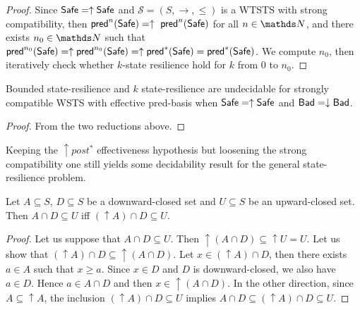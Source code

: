 \begin{proof}
Since $\textsf{Safe}=\uparrow \textsf{Safe}$ and
$\mathscr{S}=(S,\rightarrow,\leq)$ is a WTSTS with strong %
compatibility, then $\textsf{pred}^n(\textsf{Safe})= \uparrow~\textsf{pred}^n(\textsf{Safe})$ for all $n \in \N$,
and there exists $n_0 \in \N$ such that 
$\textsf{pred}^{n_0}(\textsf{Safe}) = \uparrow \textsf{pred}^{n_0}(\textsf{Safe}) = \uparrow \textsf{pred}^*(\textsf{Safe}) = \textsf{pred}^*(\textsf{Safe})$.
We compute 
$n_0$, then iteratively check whether $k$-state resilience hold for $k$ from $0$ to $n_0$.  
\end{proof}

\begin{corollary}\label{bsrp up down}
Bounded state-resilience and 
$k$ state-resilience are undecidable for strongly compatible WSTS with effective pred-basis
when
$\textsf{Safe}=\uparrow \textsf{Safe}$
and $\textsf{Bad}=\downarrow \textsf{Bad}$.
\end{corollary}

\begin{proof} 
  From the two reductions above. 
\end{proof}











Keeping the $\uparrow post^*$ effectiveness hypothesis but loosening the strong compatibility one still yields some decidability result for the general state-resilience problem.


\begin{lemma}\label{Lemma intersection}
Let $A \subseteq S$, $D \subseteq S$ be a downward-closed set and $U \subseteq S$ be an upward-closed set. 
Then $A \cap D \subseteq U$  iff $ (\uparrow  A) \cap D \subseteq U$.
\end{lemma}


\begin{proof}
Let us suppose that $A \cap D \subseteq U$. Then ${\uparrow (A \cap D)} \subseteq {\uparrow U} = U$.
Let us show that $({\uparrow A}) \cap D \subseteq {\uparrow (A \cap D)}$.
Let $x \in ({\uparrow A}) \cap D$, then there exists $a \in A$ such that $x \geq a$.
Since $x \in D$ and $D$ is downward-closed, we also have $a \in D$.
Hence $a \in A \cap D$ and then $x \in { \uparrow (A \cap D)}$.
In the other direction,
since $A \subseteq {\uparrow A}$, the inclusion
$({\uparrow  A}) \cap D \subseteq U$ implies
$A \cap D \subseteq ({\uparrow  A}) \cap D \subseteq U$.
\end{proof}



